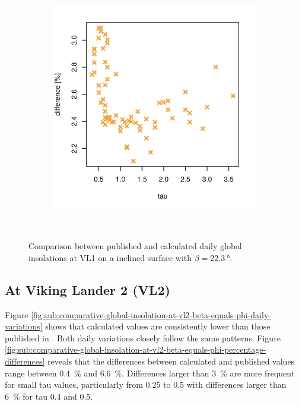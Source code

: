 \begin{figure}[H]
\begin{subfigure}[t]{\subfigureWidth}
            \includegraphics[height=\graphicsHeight]{sections/appendix/insolation-calculation-verification/plots/h-diff-bet-exp-calc-at-vl1-with-beta-223-deg.png}
            \label{fig:sub:comparative-global-insolation-at-vl1-beta-equals-phi-percentage-differences}
    \end{subfigure}\\[0.8ex]
    \caption{Comparison between published and calculated daily global insolations at \ac{VL1} on a inclined surface with $\beta=\SI{22.3}{\degree}$.}
    \label{fig:plot:comparative-global-insolation-at-vl1-beta-equals-phi}
\vspace{-2ex}
\end{figure}

\subsection{At Viking Lander 2 (VL2)}
Figure \ref{fig:sub:comparative-global-insolation-at-vl2-beta-equals-phi-daily-variations} shows that calculated values are consistently lower than those published in . Both daily variations closely follow the same patterns. Figure \ref{fig:sub:comparative-global-insolation-at-vl2-beta-equals-phi-percentage-differences} reveals that the differences between calculated and published values range between \SI{0.4}{\percent} and \SI{6.6}{\percent}. Differences larger than \SI{3}{\percent} are more frequent for small tau values, particularly from 0.25 to 0.5 with differences larger than \SI{6}{\percent} for tau 0.4 and 0.5.

